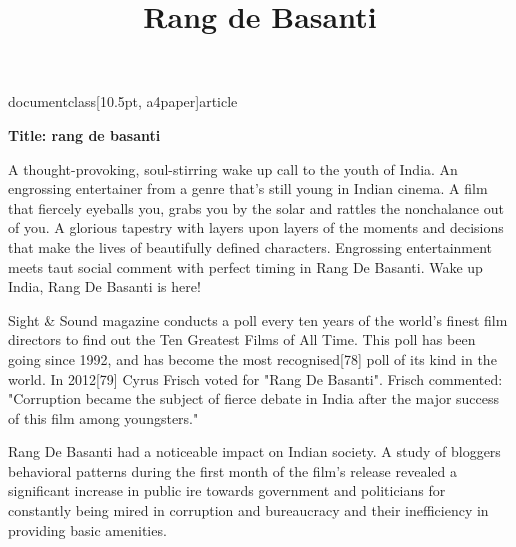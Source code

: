
documentclass[10.5pt, a4paper]{article}
\usepackage{amsfonts}
\usepackage[top=1in,left=1in,right=1in]{geometry}
\usepackage{times}
\usepackage{tabularx}
\title{Rang de Basanti}

\maketitle
\textbf{Title: rang de basanti}

A thought-provoking, soul-stirring wake up call to the youth of India. An engrossing entertainer from a genre
 that's still young in Indian cinema. A film that fiercely eyeballs you, grabs you by the solar and rattles the
 nonchalance out of you. A glorious tapestry with layers upon layers of the moments and decisions that make the
 lives of beautifully defined characters. Engrossing entertainment meets taut social comment with perfect timing
 in Rang De Basanti. Wake up India, Rang De Basanti is here!

Sight & Sound magazine conducts a poll every ten years of the world's finest film directors to find out the Ten Greatest Films of All Time. This poll has been going since 1992, and has become the most recognised[78] poll of its kind in the world. In 2012[79] Cyrus Frisch voted for "Rang De Basanti". Frisch commented: "Corruption became the subject of fierce debate in India after the major success of this film among youngsters."

Rang De Basanti had a noticeable impact on Indian society. A study of bloggers behavioral patterns during the first month of the film's release revealed a significant increase in public ire towards government and politicians for constantly being mired in corruption and bureaucracy and their inefficiency in providing basic amenities. 

